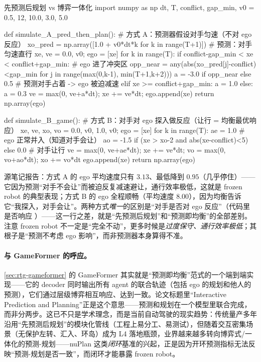 \begin{codebox}[Python]{先预测后规划 vs 博弈一体化}
import numpy as np
dt, T, conflict, gap_min, v0 = 0.5, 12, 10.0, 3.0, 5.0

def simulate_A_pred_then_plan():               # 方式 A：预测器假设对手匀速（不对 ego 反应）
    xo_pred = np.array([1.0 + v0*dt*k for k in range(T+1)])   # 预测：对手匀速直行
    xe, ve = 0.0, v0; ego = [xe]
    for k in range(T):
        if conflict-gap_min < xe < conflict+gap_min:          # ego 进了冲突区
            opp_near = any(abs(xo_pred[j]-conflict)<gap_min for j in range(max(0,k-1), min(T+1,k+2)))
            a = -3.0 if opp_near else 0.5                      # 预测对手占着 -> ego 被迫减速
        elif xe >= conflict+gap_min: a = 1.0
        else: a = 0.3
        ve = max(0, ve+a*dt); xe += ve*dt; ego.append(xe)
    return np.array(ego)

def simulate_B_game():                          # 方式 B：对手对 ego 探入做反应（让行 = 均衡最优响应）
    xe, ve, xo, vo = 0.0, v0, 1.0, v0; ego = [xe]
    for k in range(T):
        ae = 1.0                                              # ego 正常并入（知道对手会让）
        ao = -1.5 if (xe > xo-2 and abs(xe-conflict)<5) else 0.0   # 对手让行
        ve = max(0, ve+ae*dt); xe += ve*dt; vo = max(0, vo+ao*dt); xo += vo*dt
        ego.append(xe)
    return np.array(ego)
\end{codebox}

\noindent 源笔记报告：方式 A 的 ego 平均速度只有 $3.13$、最低降到 $0.95$（几乎停住）——它因为预测“对手不会让”而被迫反复减速避让，通行效率极低，这就是 frozen robot 的典型表现；方式 B 的 ego 全程顺畅（平均速度 $8.00$），因为均衡告诉它“我探入，对手会让”\cite{peters2021inferring}。两种方式\emph{唯一}的区别是“对手是否对 ego 反应”（代码里 \verb@ao@ 是否响应 \verb@xe@）——这一行之差，就是“先预测后规划”和“预测即均衡”的全部差别。注意 frozen robot 不一定是“完全不动”，更多时候是\emph{过度保守、通行效率极低}；其根子是“预测不考虑 ego 影响”，而非预测器本身算得不准。

\paragraph{与 GameFormer 的呼应。}
\cref{sec:rtg-gameformer} 的 GameFormer 其实就是“预测即均衡”范式的一个端到端实现——它的 decoder 同时输出所有 agent 的联合轨迹（包括 ego 的规划和他人的预测），它们通过层级博弈相互响应、达到一致。论文标题里“Interactive Prediction and Planning”正是这个意思——预测和规划在一个模型里联合完成，而非分两步。这已不只是学术理念，而是当前自动驾驶的现实趋势：传统量产多年沿用“先预测后规划”的模块化管线（工程上易分工、易测试），但随着交互密集场景（无保护左转、汇入、环岛）成为 L4 落地瓶颈，业界越来越多转向博弈式/一体化的预测-规划——nuPlan 这类\emph{闭环}基准的兴起，正是因为开环预测指标无法反映“预测-规划是否一致”，而闭环才能暴露 frozen robot。

